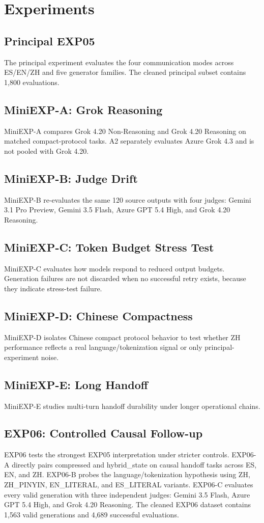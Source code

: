 \documentclass[11pt]{article}
\begin{document}
\section{Experiments}
\subsection{Principal EXP05}
The principal experiment evaluates the four communication modes across ES/EN/ZH and five generator families. The cleaned principal subset contains 1,800 evaluations.

\subsection{MiniEXP-A: Grok Reasoning}
MiniEXP-A compares Grok 4.20 Non-Reasoning and Grok 4.20 Reasoning on matched compact-protocol tasks. A2 separately evaluates Azure Grok 4.3 and is not pooled with Grok 4.20.

\subsection{MiniEXP-B: Judge Drift}
MiniEXP-B re-evaluates the same 120 source outputs with four judges: Gemini 3.1 Pro Preview, Gemini 3.5 Flash, Azure GPT 5.4 High, and Grok 4.20 Reasoning.

\subsection{MiniEXP-C: Token Budget Stress Test}
MiniEXP-C evaluates how models respond to reduced output budgets. Generation failures are not discarded when no successful retry exists, because they indicate stress-test failure.

\subsection{MiniEXP-D: Chinese Compactness}
MiniEXP-D isolates Chinese compact protocol behavior to test whether ZH performance reflects a real language/tokenization signal or only principal-experiment noise.

\subsection{MiniEXP-E: Long Handoff}
MiniEXP-E studies multi-turn handoff durability under longer operational chains.

\subsection{EXP06: Controlled Causal Follow-up}
EXP06 tests the strongest EXP05 interpretation under stricter controls. EXP06-A directly pairs compressed and hybrid\_state on causal handoff tasks across ES, EN, and ZH. EXP06-B probes the language/tokenization hypothesis using ZH, ZH\_PINYIN, EN\_LITERAL, and ES\_LITERAL variants. EXP06-C evaluates every valid generation with three independent judges: Gemini 3.5 Flash, Azure GPT 5.4 High, and Grok 4.20 Reasoning. The cleaned EXP06 dataset contains 1,563 valid generations and 4,689 successful evaluations.
\end{document}
